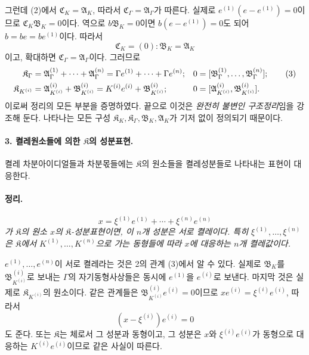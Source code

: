 그런데 (2)에서 \(\mathfrak C_K=\mathfrak A_K\), 따라서 \(\mathfrak C_\Gamma=\mathfrak A_\Gamma\)가 따른다. 실제로 \(e^{(1)}(e-e^{(1)})=0\)이므로 \(\mathfrak C_K\mathfrak B_K=0\)이다. 역으로 \(b\mathfrak B_K=0\)이면 \(b(e-e^{(1)})=0\)도 되어 \(b=be=be^{(1)}\)이다. 따라서
\[
\mathfrak C_K=(0):\mathfrak B_K=\mathfrak A_K
\]
이고, 확대하면 \(\mathfrak C_\Gamma=\mathfrak A_\Gamma\)이다. 그러므로
\begin{align}
\mathfrak K_\Gamma
&=\mathfrak A_\Gamma^{(1)}+\cdots+\mathfrak A_\Gamma^{(n)}
=\Gamma e^{(1)}+\cdots+\Gamma e^{(n)};
&0&=[\mathfrak B_\Gamma^{(1)},\ldots,\mathfrak B_\Gamma^{(n)}]; \tag{3}\\
\mathfrak K_{K^{(i)}}
&=\mathfrak A_{K^{(i)}}^{(i)}+\mathfrak B_{K^{(i)}}^{(i)}
=K^{(i)}e^{(i)}+\mathfrak B_{K^{(i)}}^{(i)};
&0&=[\mathfrak A_{K^{(i)}}^{(i)},\mathfrak B_{K^{(i)}}^{(i)}].\notag
\end{align}
이로써 정리의 모든 부분을 증명하였다. 끝으로 이것은 \emph{완전히 불변인 구조정리}임을 강조해 둔다. 나타나는 모든 구성 \(\mathfrak K_K,\mathfrak K_\Gamma,\mathfrak B_K,\mathfrak A_K\)가 기저 없이 정의되기 때문이다.

\paragraph{3. 켤레원소들에 의한 \(\mathfrak K\)의 성분표현.}
켤레 차분아이디얼들과 차분몫들에는 \(\mathfrak K\)의 원소들을 켤레성분들로 나타내는 표현이 대응한다.

\paragraph{정리.}
\emph{
\[
x=\xi^{(1)}e^{(1)}+\cdots+\xi^{(n)}e^{(n)}
\]
가 \(\mathfrak K\)의 원소 \(x\)의 \(\mathfrak K\)-성분표현이면, 이 \(n\)개 성분은 서로 켤레이다. 특히 \(\xi^{(1)},\ldots,\xi^{(n)}\)은 \(\mathfrak K\)에서 \(K^{(1)},\ldots,K^{(n)}\)으로 가는 동형들에 따라 \(x\)에 대응하는 \(n\)개 켤레값이다.}

\(e^{(1)},\ldots,e^{(n)}\)이 서로 켤레라는 것은 2의 관계 (3)에서 알 수 있다. 실제로 \(\mathfrak B_K\)를 \(\mathfrak B_{K^{(i)}}^{(i)}\)로 보내는 \(\Gamma\)의 자기동형사상들은 동시에 \(e^{(1)}\)을 \(e^{(i)}\)로 보낸다. 마지막 것은 실제로 \(\mathfrak K_{K^{(i)}}\)의 원소이다. 같은 관계들은 \(\mathfrak B_{K^{(i)}}^{(i)}e^{(i)}=0\)이므로 \(xe^{(i)}=\xi^{(i)}e^{(i)}\), 따라서
\[
(x-\xi^{(i)})e^{(i)}=0
\]
도 준다. 또는 \(\mathfrak K\)는 체로서 그 성분과 동형이고, 그 성분은 \(x\)와 \(\xi^{(i)}e^{(i)}\)가 동형으로 대응하는 \(K^{(i)}e^{(i)}\)이므로 같은 사실이 따른다.

